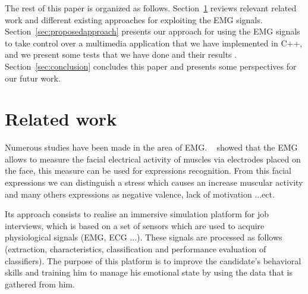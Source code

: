 \documentclass[conference]{IEEEtran}
\begin{document}
The rest of this paper is organized as follows.
Section~\ref{sec:related} reviews relevant related work and different existing approaches for exploiting the EMG signals. Section~\ref{sec:proposedapproach} presents our approach for using the EMG signals to take control over a multimedia application that we have implemented in C++, and we present some tests that we have done and their results . Section~\ref{sec:conclusion} concludes this paper and presents some perspectives for our futur work.\par
\section{Related work} \label{sec:related}


Numerous studies have been made in the area of EMG. ~\cite{Hamdi} showed that the EMG allows to measure the facial electrical activity of muscles via electrodes placed on the face, this measure can be used for expressions recognition. From this facial expressions we can distinguish a stress which causes an increase muscular activity and many others expressions as negative valence, lack of motivation ...ect. \par

Its approach consists to realise an immersive simulation platform for job interviews, which is based on a set of sensors which are used to acquire physiological signals (EMG, ECG ...). These signals are processed as follows (extraction, characteristics, classification and performance evaluation of classifiers). The purpose of this platform is to improve the candidate's behavioral skills and training him to manage his emotional state by using the data that is gathered from him.\par
\end{document}
